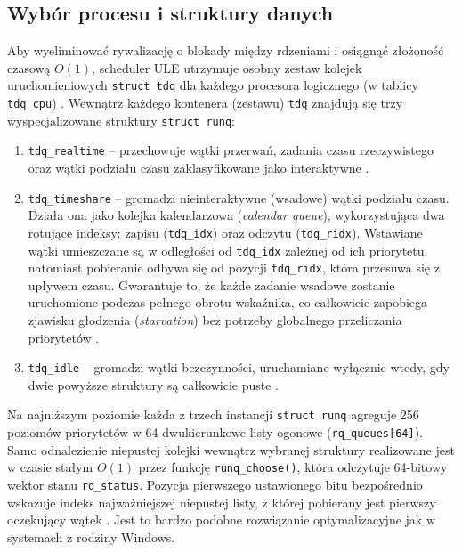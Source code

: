 \subsection{Wybór procesu i struktury danych}
Aby wyeliminować rywalizację o blokady między rdzeniami i osiągnąć złożoność czasową $O(1)$, scheduler ULE utrzymuje osobny zestaw kolejek uruchomieniowych \texttt{struct tdq} dla każdego procesora logicznego (w tablicy \texttt{tdq\_cpu}) \cite{freebsdSchedUleC}. Wewnątrz każdego kontenera (zestawu) \texttt{tdq} znajdują się trzy wyspecjalizowane struktury \texttt{struct runq}:
\begin{enumerate}
	\item \texttt{tdq\_realtime} -- przechowuje wątki przerwań, zadania czasu rzeczywistego oraz wątki podziału czasu zaklasyfikowane jako interaktywne \cite{mckusick2014freebsd, freebsdSchedUleC}.
	\item \texttt{tdq\_timeshare} -- gromadzi nieinteraktywne (wsadowe) wątki podziału czasu. Działa ona jako kolejka kalendarzowa (\textit{calendar queue}), wykorzystująca dwa rotujące indeksy: zapisu (\texttt{tdq\_idx}) oraz odczytu (\texttt{tdq\_ridx}). Wstawiane wątki umieszczane są w odległości od \texttt{tdq\_idx} zależnej od ich priorytetu, natomiast pobieranie odbywa się od pozycji \texttt{tdq\_ridx}, która przesuwa się z upływem czasu. Gwarantuje to, że każde zadanie wsadowe zostanie uruchomione podczas pełnego obrotu wskaźnika, co całkowicie zapobiega zjawisku głodzenia (\textit{starvation}) bez potrzeby globalnego przeliczania priorytetów \cite{mckusick2014freebsd, freebsdSchedUleC}.
	\item \texttt{tdq\_idle} -- gromadzi wątki bezczynności, uruchamiane wyłącznie wtedy, gdy dwie powyższe struktury są całkowicie puste \cite{freebsdSchedUleC}.
\end{enumerate}

Na najniższym poziomie każda z trzech instancji \texttt{struct runq} agreguje 256 poziomów priorytetów w 64 dwukierunkowe listy ogonowe (\texttt{rq\_queues[64]}). Samo odnalezienie niepustej kolejki wewnątrz wybranej struktury realizowane jest w czasie stałym $O(1)$ przez funkcję \texttt{runq\_choose()}, która odczytuje 64-bitowy wektor stanu \texttt{rq\_status}. Pozycja pierwszego ustawionego bitu bezpośrednio wskazuje indeks najważniejszej niepustej listy, z której pobierany jest pierwszy oczekujący wątek \cite{mckusick2014freebsd, freebsdRunqH}. Jest to bardzo podobne rozwiązanie optymalizacyjne jak w systemach z rodziny Windows.